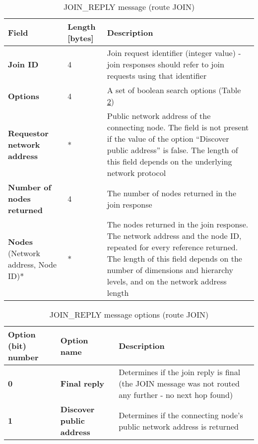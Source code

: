 \begin{table}[H]
\scriptsize
\begin{center}
\begin{tabular}{p{3.3cm} p{1.7cm} p{9.5cm}}
	\hline
	\textbf{Field}						& \textbf{Length} [bytes]				& \textbf{Description}				\\[1mm]
    \hline
    \textbf{Join ID}					& 4										& Join request identifier (integer value) - join responses should refer to join requests using that identifier					\\[1.5mm]
	\textbf{Options}					& 4										& A set of boolean search options (Table \ref{tab:mRouteJoinReplyOptions})				\\[1.5mm]
	\textbf{Requestor network address}	\newline [Optional]		& *				& Public network address of the connecting node. The field is not present if the value of the option ``Discover public address'' is false. \newline * The length of this field depends on the underlying network protocol 					\\[1.5mm]
	\textbf{Number of nodes returned}	& 4										& The number of nodes returned in the join response					\\[1.5mm]
	\textbf{Nodes} \newline (Network address, Node ID)*			& *				& The nodes returned in the join response. The network address and the node ID, repeated for every reference returned. \newline * The length of this field depends on the number of dimensions and hierarchy levels, and on the network address length		\\[1.5mm]	
    \hline
\end{tabular}
\end{center}
\caption{JOIN\_REPLY message (route JOIN)}
\label{tab:mRouteJoinReply}
\end{table}

\begin{table}[H]
\scriptsize
\begin{center}
\begin{tabular}{p{3cm} p{3cm} p{8.5cm}}
	\hline
	\textbf{Option (bit) number}			& \textbf{Option name}					& \textbf{Description}				\\[1mm]
    \hline
	\textbf{0}								& \textbf{Final reply}					& Determines if the join reply is final (the JOIN message was not routed any further - no next hop found)			\\[1.5mm]
	\textbf{1}								& \textbf{Discover public address}		& Determines if the connecting node's public network address is returned						\\[1.5mm]
    \hline
\end{tabular}
\end{center}
\caption{JOIN\_REPLY message options (route JOIN)}
\label{tab:mRouteJoinReplyOptions}
\end{table}











